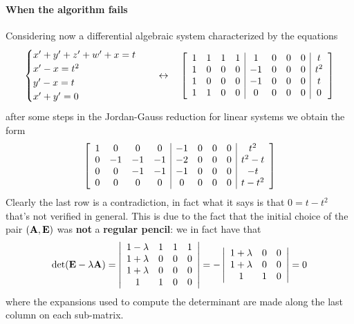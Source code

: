 	\paragraph{When the algorithm fails} Considering now a differential algebraic system characterized by the equations
	\[ \begin{cases}
		x' + y' + z' + w' + x = t \\
		x' - x = t^2 \\
		y' - x = t \\
		x'+y' = 0
	\end{cases} \quad \leftrightarrow \quad \begin{bmatrix}  \begin{array}{ cccc | cccc | c}
		1 & 1 & 1 & 1 & 1 & 0 & 0 & 0 & t \\
		1 & 0 & 0 & 0 & -1& 0 & 0 & 0 & t^2 \\
		1 & 0 & 0 & 0 & -1& 0 & 0 & 0 & t \\
		1 & 1 & 0 & 0 & 0 & 0 & 0 & 0 & 0
	\end{array}  \end{bmatrix} \]
	after some steps in the Jordan-Gauss reduction for linear systems we obtain the form
	\[ \begin{bmatrix}  \begin{array}{ cccc | cccc | c}
			1 & 0 & 0 & 0 & -1 & 0 & 0 & 0 & t^2 \\
			0 & -1& -1& -1& -2 & 0 & 0 & 0 & t^2-t \\
			0 & 0 & - 1 &-1 & -1 & 0 & 0 & 0 & -t \\
			0 & 0 & 0 & 0 & 0 & 0 & 0 & 0 & t - t^2
	\end{array}  \end{bmatrix} \]
	Clearly the last row is a contradiction, in fact what it says is that $0= t-t^2$ that's not verified in general. This is due to the fact that the initial choice of the pair $(\mathbf{A},\mathbf{E})$ was \textbf{not} a \textbf{regular pencil}: we in fact have that
	\[ \det(\mathbf{E} - \lambda \mathbf{A}) = \left| \begin{array}{cccc}
		1-\lambda & 1 & 1 & 1 \\
		1+\lambda & 0 & 0 & 0 \\
		1+\lambda & 0 & 0 & 0 \\
		1 & 1 & 0 & 0 
	\end{array} \right| = - \left| \begin{array}{cccc}
		1+\lambda & 0 & 0  \\
		1+\lambda & 0 & 0 \\
		1 & 1 & 0  
	\end{array} \right| = 0 \]
	where the expansions used to compute the determinant are made along the last column on each sub-matrix.
	
